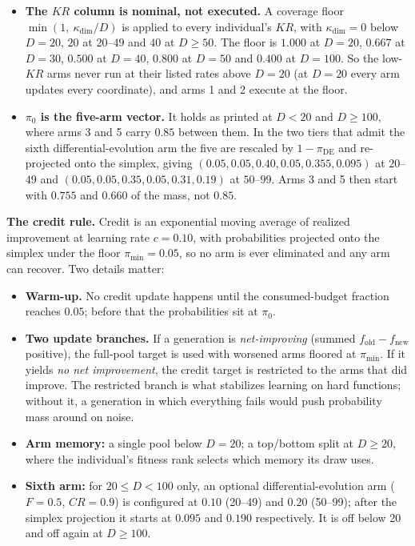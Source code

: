 \documentclass[11pt,a4paper]{article}
\newcommand{\hl}[1]{\textbf{#1}}
\begin{document}
\begin{itemize}[leftmargin=1.2em, itemsep=1pt, topsep=3pt]
\item \textbf{The $KR$ column is nominal, not executed.} A coverage floor
      $\min(1,\ \kappa_{\dim}/D)$ is applied to every individual's $KR$, with
      $\kappa_{\dim} = 0$ below $D=20$, $20$ at $20$--$49$ and $40$ at
      $D\geq50$. The floor is $1.000$ at $D=20$, $0.667$ at $D=30$, $0.500$ at
      $D=40$, $0.800$ at $D=50$ and $0.400$ at $D=100$. So the low-$KR$ arms
      never run at their listed rates above $D=20$ (at $D=20$ every arm
      updates every coordinate), and arms 1 and 2 execute at the floor.
\item \textbf{$\pi_0$ is the five-arm vector.} It holds as printed at $D<20$
      and $D\geq100$, where arms 3 and 5 carry $0.85$ between them. In the two
      tiers that admit the sixth differential-evolution arm the five are
      rescaled by $1-\pi_{\mathrm{DE}}$ and re-projected onto the simplex,
      giving $(0.05, 0.05, 0.40, 0.05, 0.355, 0.095)$ at $20$--$49$ and
      $(0.05, 0.05, 0.35, 0.05, 0.31, 0.19)$ at $50$--$99$. Arms 3 and 5 then
      start with $0.755$ and $0.660$ of the mass, not $0.85$.
\end{itemize}

\hl{The credit rule.} Credit is an exponential moving average of realized
improvement at learning rate $c = 0.10$, with probabilities projected onto the
simplex under the floor $\pi_{\min} = 0.05$, so no arm is ever eliminated
and any arm can recover. Two details matter:

\begin{itemize}[leftmargin=1.2em, itemsep=1pt, topsep=3pt]
\item \textbf{Warm-up.} No credit update happens until the consumed-budget
      fraction reaches $0.05$; before that the probabilities sit at $\pi_0$.
\item \textbf{Two update branches.} If a generation is \emph{net-improving}
      (summed $f_{\mathrm{old}} - f_{\mathrm{new}}$ positive), the full-pool
      target is used with worsened arms floored at $\pi_{\min}$. If it yields
      \emph{no net improvement}, the credit target is restricted to the arms
      that did improve. The restricted branch is what stabilizes learning on
      hard functions; without it, a generation in which everything fails
      would push probability mass around on noise.
\end{itemize}

\begin{itemize}[leftmargin=1.2em, itemsep=1pt, topsep=3pt]
\item \textbf{Arm memory:} a single pool below $D = 20$; a top/bottom split at
      $D \geq 20$, where the individual's fitness rank selects which memory its
      draw uses.
\item \textbf{Sixth arm:} for $20 \leq D < 100$ only, an optional
      differential-evolution arm ($F = 0.5$, $CR = 0.9$) is configured at
      $0.10$ (20--49) and $0.20$ (50--99); after the simplex projection it
      starts at $0.095$ and $0.190$ respectively. It is off below 20 and off
      again at $D \geq 100$.
\end{itemize}
\end{document}
